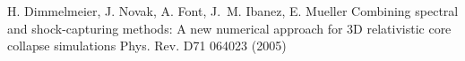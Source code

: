 









\begin{thebibliography}{9}

H. Dimmelmeier, J. Novak, A. Font, J.~M. Ibanez, E. Mueller 
\newblock 
Combining spectral and shock-capturing methods: A new numerical approach 
for 3D relativistic core collapse simulations
\newblock Phys. Rev. D71 064023 (2005)

\end{thebibliography}




